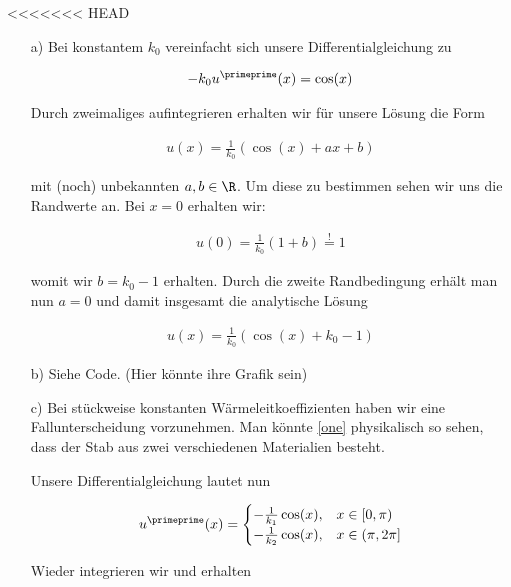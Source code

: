 \begin{solution}
<<<<<<< HEAD
  \begin{itemize}
    \item[a)] Bei konstantem $k_0$ vereinfacht sich unsere Differentialgleichung zu

    \begin{align*}
      -k_0 u ^\primeprime(x) = \cos(x)
    \end{align*}

    Durch zweimaliges aufintegrieren erhalten wir für unsere Lösung die Form

    \begin{align*}
      u(x)
      =
      \frac{1}{k_0}(\cos(x)+ax+b)
    \end{align*}

    mit (noch) unbekannten $a,b \in \R$. Um diese zu bestimmen sehen wir uns die
    Randwerte an. Bei $x=0$ erhalten wir:

    \begin{align*}
      u(0)
      =
      \frac{1}{k_0}(1+b)
      \stackrel{!}{=}
      1
    \end{align*}

    womit wir $b = k_0 -1$ erhalten. Durch die zweite Randbedingung erhält man nun
    $a = 0$ und damit insgesamt die analytische Lösung

    \begin{align*}
      u(x)
      =
      \frac{1}{k_0}(\cos(x)+k_0-1)
    \end{align*}

    \item[b)] Siehe Code. (Hier könnte ihre Grafik sein)

    \item[c)] Bei stückweise konstanten Wärmeleitkoeffizienten haben wir eine
    Fallunterscheidung vorzunehmen. Man könnte \eqref{one} physikalisch so sehen,
    dass der Stab aus zwei verschiedenen Materialien besteht.

    Unsere Differentialgleichung lautet nun

    \begin{align*}
      u^\primeprime(x)
      =
      \begin{cases}
        -\frac{1}{k_1} \cos(x), & x \in [0,\pi) \\
        -\frac{1}{k_2} \cos(x), & x \in (\pi, 2\pi]
      \end{cases}
    \end{align*}

    Wieder integrieren wir und erhalten


\end{itemize}
\end{solution}
